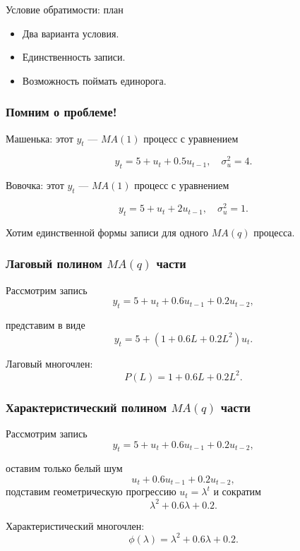 
\begin{frame} %


\end{frame}



\begin{frame}{Условие обратимости: план}
  \begin{itemize}[<+->]
    \item Два варианта условия. 
    \item Единственность записи.
    \item Возможность \alert{поймать единорога}.
  \end{itemize}

\end{frame}


\begin{frame}
  \frametitle{Помним о проблеме!}

  Машенька: этот $y_t$ — $MA(1)$ процесс с уравнением

  \[
    y_t = 5 + u_t + 0.5 u_{t-1}, \quad \sigma^2_u = 4.
  \]

  Вовочка: этот $y_t$ — $MA(1)$ процесс с уравнением

  \[
    y_t = 5 + u_t + 2 u_{t-1}, \quad \sigma^2_u = 1.
  \]

  \pause
  Хотим \alert{единственной формы} записи для одного $MA(q)$ процесса. 

\end{frame}


\begin{frame}
    \frametitle{Лаговый полином $MA(q)$ части}

    Рассмотрим запись 
    \[
        y_t = 5 + u_t + 0.6u_{t-1} + 0.2u_{t-2},
    \]

    \pause
    представим в виде
    \[
      y_t = 5 + (1 + 0.6 L + 0.2 L^2) u_t.
    \]

    \pause
    \alert{Лаговый многочлен}:
    \[
    P(L) = 1 + 0.6 L + 0.2 L^2.
    \]

\end{frame}

\begin{frame}
    \frametitle{Характеристический полином $MA(q)$ части}

    Рассмотрим запись 
    \[
        y_t = 5 + u_t + 0.6u_{t-1} + 0.2u_{t-2},
    \]

    \pause
    оставим только белый шум
    \[
        u_t + 0.6u_{t-1} + 0.2u_{t-2},
    \]
    \pause 
    подставим геометрическую прогрессию $u_t = \lambda^t$ и сократим
    \[
     \lambda^2 + 0.6 \lambda + 0.2.
    \]

    \pause
    \alert{Характеристический многочлен}:
    \[
    \phi(\lambda) = \lambda^2 + 0.6 \lambda + 0.2.
    \]

\end{frame}

